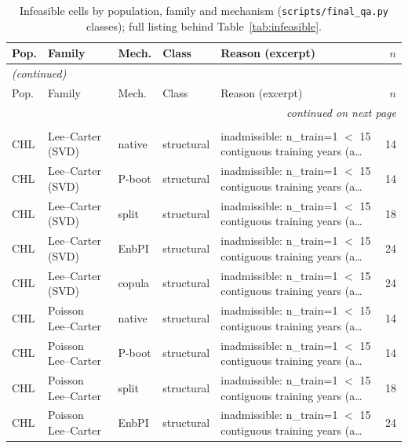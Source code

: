 {\footnotesize\setlength{\tabcolsep}{2.5pt}
\begin{longtable}{@{}lllp{1.6cm}p{6.2cm}r@{}}
\caption{Infeasible cells by population, family and mechanism (\texttt{scripts/final\_qa.py} classes); full listing behind Table~\ref{tab:infeasible}.}\label{tab:infeasible-full} \\
\toprule
Pop. & Family & Mech. & Class & Reason (excerpt) & $n$ \\
\midrule
\endfirsthead
\multicolumn{6}{l}{\emph{(continued)}} \\
\toprule
Pop. & Family & Mech. & Class & Reason (excerpt) & $n$ \\
\midrule
\endhead
\midrule \multicolumn{6}{r}{\emph{continued on next page}} \\
\endfoot
\bottomrule
\endlastfoot
\multicolumn{6}{l}{\textbf{stable regime}} \\
\midrule
CHL & Lee--Carter (SVD) & native & structural & inadmissible: n\_train=1 $<$ 15 contiguous training years (a\ldots & 14 \\
CHL & Lee--Carter (SVD) & P-boot & structural & inadmissible: n\_train=1 $<$ 15 contiguous training years (a\ldots & 14 \\
CHL & Lee--Carter (SVD) & split & structural & inadmissible: n\_train=1 $<$ 15 contiguous training years (a\ldots & 18 \\
CHL & Lee--Carter (SVD) & EnbPI & structural & inadmissible: n\_train=1 $<$ 15 contiguous training years (a\ldots & 24 \\
CHL & Lee--Carter (SVD) & copula & structural & inadmissible: n\_train=1 $<$ 15 contiguous training years (a\ldots & 24 \\
CHL & Poisson Lee--Carter & native & structural & inadmissible: n\_train=1 $<$ 15 contiguous training years (a\ldots & 14 \\
CHL & Poisson Lee--Carter & P-boot & structural & inadmissible: n\_train=1 $<$ 15 contiguous training years (a\ldots & 14 \\
CHL & Poisson Lee--Carter & split & structural & inadmissible: n\_train=1 $<$ 15 contiguous training years (a\ldots & 18 \\
CHL & Poisson Lee--Carter & EnbPI & structural & inadmissible: n\_train=1 $<$ 15 contiguous training years (a\ldots & 24 \\

\end{longtable}}
